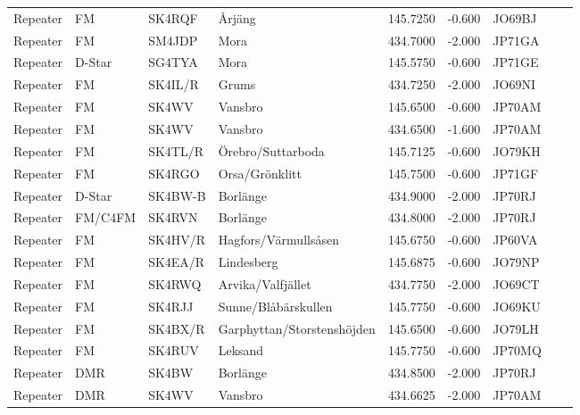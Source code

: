 \begin{longtable}{llllrrlcl}
	Repeater & FM         & SK4RQF   & Årjäng                     &   145.7250 &   -0.600 & JO69BJ &  &  \\
	Repeater & FM         & SM4JDP   & Mora                       &   434.7000 &   -2.000 & JP71GA &  &  \\
	Repeater & D-Star     & SG4TYA   & Mora                       &   145.5750 &   -0.600 & JP71GE &  &  \\
	Repeater & FM         & SK4IL/R  & Grums                      &   434.7250 &   -2.000 & JO69NI &  &  \\
	Repeater & FM         & SK4WV    & Vansbro                    &   145.6500 &   -0.600 & JP70AM &  &  \\
	Repeater & FM         & SK4WV    & Vansbro                    &   434.6500 &   -1.600 & JP70AM &  &  \\
	Repeater & FM         & SK4TL/R  & Örebro/Suttarboda          &   145.7125 &   -0.600 & JO79KH &  &  \\
	Repeater & FM         & SK4RGO   & Orsa/Grönklitt             &   145.7500 &   -0.600 & JP71GF &  &  \\
	Repeater & D-Star     & SK4BW-B  & Borlänge                   &   434.9000 &   -2.000 & JP70RJ &  &  \\
	Repeater & FM/C4FM    & SK4RVN   & Borlänge                   &   434.8000 &   -2.000 & JP70RJ &  &  \\
	Repeater & FM         & SK4HV/R  & Hagfors/Värmullsåsen       &   145.6750 &   -0.600 & JP60VA &  &  \\
	Repeater & FM         & SK4EA/R  & Lindesberg                 &   145.6875 &   -0.600 & JO79NP &  &  \\
	Repeater & FM         & SK4RWQ   & Arvika/Valfjället          &   434.7750 &   -2.000 & JO69CT &  &  \\
	Repeater & FM         & SK4RJJ   & Sunne/Blåbärskullen        &   145.7750 &   -0.600 & JO69KU &  &  \\
	Repeater & FM         & SK4BX/R  & Garphyttan/Storstenshöjden &   145.6500 &   -0.600 & JO79LH &  &  \\
	Repeater & FM         & SK4RUV   & Leksand                    &   145.7750 &   -0.600 & JP70MQ &  &  \\
	Repeater & DMR        & SK4BW    & Borlänge                   &   434.8500 &   -2.000 & JP70RJ &  &  \\
	Repeater & DMR        & SK4WV    & Vansbro                    &   434.6625 &   -2.000 & JP70AM &  &  \\

\end{longtable}
